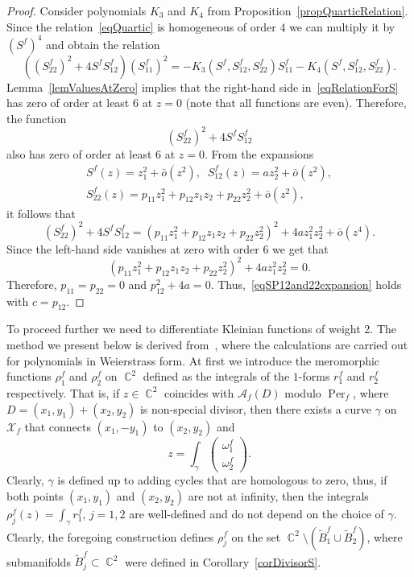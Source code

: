 \documentclass{amsart}
\numberwithin{equation}{section}
\theoremstyle{definition}
\theoremstyle{remark}
\DeclareMathOperator{\CC}{\mathbb C}
\DeclareMathOperator{\Per}{Per}
\begin{document}
	\begin{proof}
		Consider polynomials $K_3$ and $K_4$ from Proposition~\ref{propQuarticRelation}. Since the relation~\eqref{eqQuartic} is homogeneous of order $4$ we can multiply it by $\left(S^f\right)^4$ and obtain the relation
		\begin{equation}\label{eqRelationForS}
			\left(\left(S_{22}^f\right)^2 + 4S^fS_{12}^f\right)\left(S_{11}^f\right)^2 = - K_3\left(S^f, S_{12}^f, S_{22}^f\right)S_{11}^f - K_4\left(S^f, S_{12}^f, S_{22}^f\right).
		\end{equation}
		Lemma~\ref{lemValuesAtZero} implies that the right-hand side in~\eqref{eqRelationForS} has zero of order at least $6$ at $z = 0$ (note that all functions are even). Therefore, the function \[
		\left(S_{22}^f\right)^2 + 4S^fS_{12}^f
		\] 
		also has zero of order at least $6$ at $z = 0$.  From the expansions
		\[
		\begin{gathered}
			S^f(z) = z_1^2 + \bar{o}(z^2),\;\;S_{12}^f(z) = az_2^2 + \bar{o}(z^2),\\S_{22}^f(z) = p_{11}z_1^2 + p_{12}z_1z_2 + p_{22}z_2^2 + \bar{o}(z^2),
		\end{gathered}
		\]
		it follows that 
		\[
		\left(S_{22}^f\right)^2 + 4S^fS_{12}^f = (p_{11}z_1^2 + p_{12}z_1z_2 + p_{22}z_2^2)^2 + 4az_1^2z_2^2 + \bar{o}(z^4).
		\]
		Since the left-hand side vanishes at zero with order $6$ we get that
		\[
		(p_{11}z_1^2 + p_{12}z_1z_2 + p_{22}z_2^2)^2 + 4az_1^2z_2^2 = 0.
		\]
		Therefore, $p_{11} = p_{22} = 0$ and $p_{12}^2 + 4a = 0$. Thus,~\eqref{eqSP12and22expansion} holds with $c = p_{12}$.
	\end{proof}
	
	To proceed further we need to differentiate Kleinian functions of weight 2. The method we present below is derived from~\cite{baker}, where the calculations are carried out for polynomials in Weierstrass form. At first we introduce the meromorphic functions $\rho^f_1$ and $\rho^f_2$ on $\CC^2$ defined as the integrals of the $1$-forms $r_1^f$ and $r_2^f$ respectively. That is, if $z \in \CC^2$ coincides with $\mathscr A_f(D)$ modulo $\Per_f$, where $D = (x_1,y_1) + (x_2,y_2)$ is non-special divisor, then there exists a curve $\gamma$ on $\mathcal X_f$ that connects $(x_1, -y_1)$ to $(x_2, y_2)$ and \[
	z = \int_\gamma \begin{pmatrix}
		\omega_1^f \\ \omega_2^f
	\end{pmatrix}.
	\]
	Clearly, $\gamma$ is defined up to adding cycles that are homologous to zero, thus, if both points $(x_1,y_1)$ and $(x_2,y_2)$ are not at infinity, then the integrals $\rho^f_j(z) = \int_\gamma r_1^f$, $j = 1,2$ are well-defined and do not depend on the choice of $\gamma$. Clearly, the foregoing construction defines $\rho_j^f$ on the set $\CC^2 \setminus (\tilde B^f_1 \cup \tilde B^f_2)$, where submanifolds $\tilde B^f_j \subset \CC^2$ were defined in Corollary~\ref{corDivisorS}.
	
\end{document}
